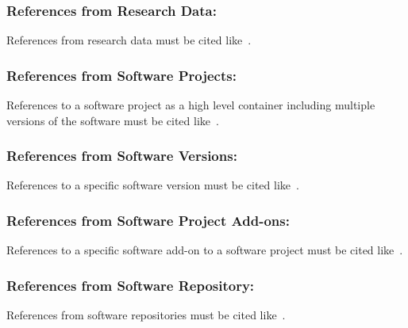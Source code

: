 \documentclass{isprs} %
\begin{document}
\subsubsection{References from Research Data:}
References from research data must be cited like~\cite{dubayah2013}.

\subsubsection{References from Software Projects:}
References to a software project as a high level container including multiple versions of the software must be cited like~\cite{grass2017}.

\subsubsection{References from Software Versions:}
References to a specific software version must be cited like~\cite{grass2015}.

\subsubsection{References from Software Project Add-ons:}
References to a specific software add-on to a software project must be cited like~\cite{lennert2017}.

\subsubsection{References from Software Repository:}
References from software repositories must be cited like~\cite{gago2016}.

{
	\begin{spacing}{1.17}
		\normalsize
	\end{spacing}
}
\end{document}
